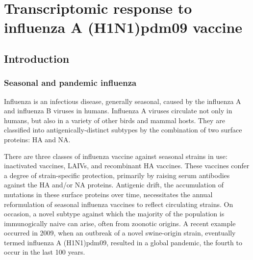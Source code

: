 %
%

\chapter{Transcriptomic response to influenza A (H1N1)pdm09 vaccine}


\section{Introduction}

\subsection{Seasonal and pandemic influenza}

Influenza is an infectious disease, generally seasonal, caused by the influenza A and influenza B viruses in humans.
Influenza A viruses circulate not only in humans, but also in a variety of other birds and mammal hosts.
They are classified into antigenically-distinct subtypes by the combination of two surface proteins: \gls{HA} and \gls{NA}\autocite{krammer2018Influenza}.

There are three classes of influenza vaccine against seasonal strains in use: inactivated vaccines, \glspl{LAIV}, and recombinant \gls{HA} vaccines.
These vaccines confer a degree of strain-specific protection, primarily by raising serum antibodies against the \gls{HA} and/or \gls{NA} proteins.
Antigenic drift, the accumulation of mutations in these surface proteins over time, necessitates the annual reformulation of seasonal influenza vaccines to reflect circulating strains\autocite{houser2015InfluenzaVaccinesChallenges, sautto2018UniversalInfluenzaVaccine}.
On occasion, a novel subtype against which the majority of the population is immunogically naive can arise, often from zoonotic origins.
A recent example occurred in 2009, when an outbreak of a novel swine-origin strain, eventually termed influenza A (H1N1)pdm09, resulted in a global pandemic, the fourth to occur in the last 100 years\autocite{krammer2018Influenza}.
%

